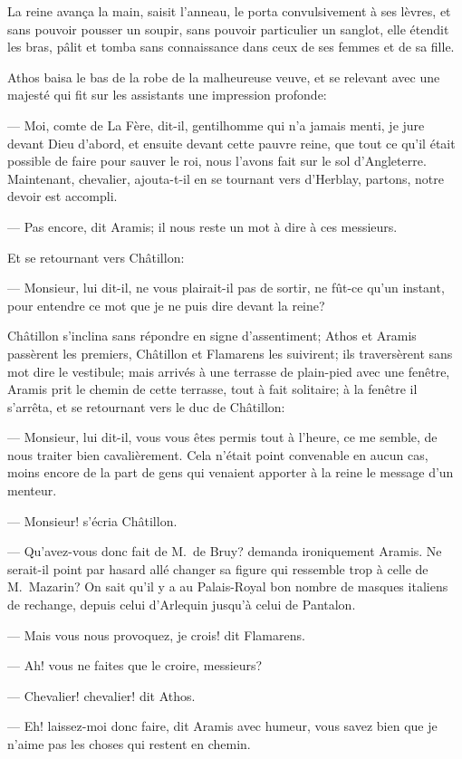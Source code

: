 La reine avança la main, saisit l'anneau, le porta convulsivement à ses lèvres, et sans pouvoir pousser un soupir, sans pouvoir particulier un sanglot, elle étendit les bras, pâlit et tomba sans connaissance dans ceux de ses femmes et de sa fille.

Athos baisa le bas de la robe de la malheureuse veuve, et se relevant avec une majesté qui fit sur les assistants une impression profonde:

— Moi, comte de La Fère, dit-il, gentilhomme qui n'a jamais menti, je jure devant Dieu d'abord, et ensuite devant cette pauvre reine, que tout ce qu'il était possible de faire pour sauver le roi, nous l'avons fait sur le sol d'Angleterre. Maintenant, chevalier, ajouta-t-il en se tournant vers d'Herblay, partons, notre devoir est accompli.

— Pas encore, dit Aramis; il nous reste un mot à dire à ces messieurs.

Et se retournant vers Châtillon:

— Monsieur, lui dit-il, ne vous plairait-il pas de sortir, ne fût-ce qu'un instant, pour entendre ce mot que je ne puis dire devant la reine?

Châtillon s'inclina sans répondre en signe d'assentiment; Athos et Aramis passèrent les premiers, Châtillon et Flamarens les suivirent; ils traversèrent sans mot dire le vestibule; mais arrivés à une terrasse de plain-pied avec une fenêtre, Aramis prit le chemin de cette terrasse, tout à fait solitaire; à la fenêtre il s'arrêta, et se retournant vers le duc de Châtillon:

— Monsieur, lui dit-il, vous vous êtes permis tout à l'heure, ce me semble, de nous traiter bien cavalièrement. Cela n'était point convenable en aucun cas, moins encore de la part de gens qui venaient apporter à la reine le message d'un menteur.

— Monsieur! s'écria Châtillon.

— Qu'avez-vous donc fait de M.~de Bruy? demanda ironiquement Aramis. Ne serait-il point par hasard allé changer sa figure qui ressemble trop à celle de M.~Mazarin? On sait qu'il y a au Palais-Royal bon nombre de masques italiens de rechange, depuis celui d'Arlequin jusqu'à celui de Pantalon.

— Mais vous nous provoquez, je crois! dit Flamarens.

— Ah! vous ne faites que le croire, messieurs?

— Chevalier! chevalier! dit Athos.

— Eh! laissez-moi donc faire, dit Aramis avec humeur, vous savez bien que je n'aime pas les choses qui restent en chemin.


